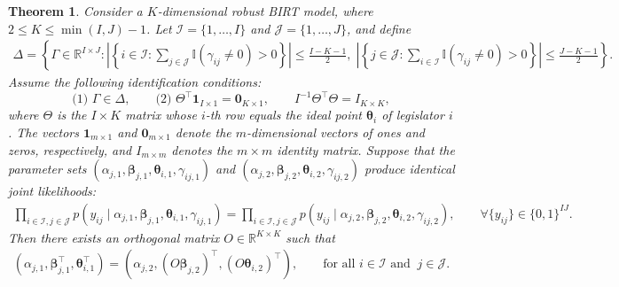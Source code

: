 \documentclass[11pt]{article}
\newtheorem{theorem}{Theorem} \newtheorem{theoremstar}{Theorem}
\begin{document}
\begin{theorem}\label{theorem3}
Consider a $K$-dimensional robust BIRT model, where $2 \le K \le \min(I,J)-1$. Let $\mathcal{I}=\{1,\ldots,I\}$ and  $\mathcal{J}=\{1,\ldots,J\}$, and define
\begin{align*}
    \Delta = \left\{
    \Gamma \in \mathbb{R}^{I \times J} :
    \left|\left\{
    i \in \mathcal{I} : \sum_{j\in\mathcal{J}} \mathbb{I}(\gamma_{ij}\neq 0)>0
    \right\}\right| \le \frac{I-K-1}{2},\;
    \left|\left\{
    j \in \mathcal{J} : \sum_{i\in\mathcal{I}} \mathbb{I}(\gamma_{ij}\neq 0)>0
    \right\}\right| \le \frac{J-K-1}{2}
    \right\}.
\end{align*}
Assume the following identification conditions:
\begin{equation*}
    \text{(1) }\Gamma\in\Delta,\qquad
    \text{(2) } \Theta^\top \boldsymbol{1}_{I\times 1} = \boldsymbol{0}_{K\times 1},\qquad
    I^{-1}\Theta^\top \Theta = I_{K\times K},    
\end{equation*}
where $\Theta$ is the $I\times K$ matrix whose $i$-th row equals the ideal point $\boldsymbol{\theta}_i$ of legislator $i$. The vectors $\boldsymbol{1}_{m\times 1}$ and $\boldsymbol{0}_{m\times 1}$ denote the $m$-dimensional vectors of ones and zeros, respectively, and $I_{m\times m}$ denotes the $m\times m$ identity matrix.
Suppose that the parameter sets $(\alpha_{j,1},\boldsymbol{\beta}_{j,1},\boldsymbol{\theta}_{i,1},\gamma_{ij,1})$ and $(\alpha_{j,2},\boldsymbol{\beta}_{j,2},\boldsymbol{\theta}_{i,2},\gamma_{ij,2})$ produce identical joint likelihoods:
\begin{align}\label{eqn:eqn1_MD}
    \prod_{i\in\mathcal{I}, j\in\mathcal{J}}
    p(y_{ij}\mid \alpha_{j,1}, \boldsymbol{\beta}_{j,1}, 
    \boldsymbol{\theta}_{i,1}, \gamma_{ij,1})
    =
    \prod_{i\in\mathcal{I}, j\in\mathcal{J}}
    p(y_{ij}\mid \alpha_{j,2}, \boldsymbol{\beta}_{j,2}, 
    \boldsymbol{\theta}_{i,2}, \gamma_{ij,2}),
    \qquad
    \forall \{y_{ij}\}\in\{0,1\}^{IJ}.
\end{align}
Then there exists an orthogonal matrix $O\in\mathbb{R}^{K\times K}$ such that
\begin{align}\label{eqn:eqn2_MD}
    (\alpha_{j,1}, \boldsymbol{\beta}_{j,1}^\top, \boldsymbol{\theta}_{i,1}^\top)
    =
    (\alpha_{j,2}, (O\boldsymbol{\beta}_{j,2})^\top, 
    (O\boldsymbol{\theta}_{i,2})^\top),
    \qquad
    \text{for all } i\in\mathcal{I} \text{ and }\ j\in\mathcal{J}.
\end{align}
\end{theorem}
\end{document}
